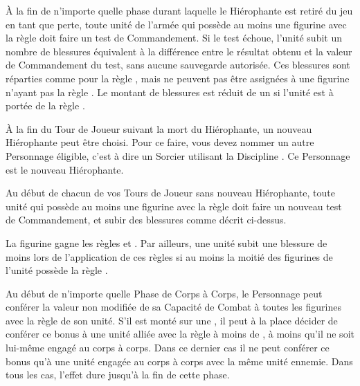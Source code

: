 \vspace*{1.5cm}
\startarmyspecialrules

\armyspecialruleentry{\dusttodust{}}

À la fin de n'importe quelle phase durant laquelle le Hiérophante est retiré du jeu en tant que perte, toute unité de l'armée qui possède au moins une figurine avec la règle \dusttodust{} doit faire un test de Commandement. Si le test échoue, l'unité subit un nombre de blessures équivalent à la différence entre le résultat obtenu et la valeur de Commandement du test, sans aucune sauvegarde autorisée. Ces blessures sont réparties comme pour la règle \unstable{}, mais ne peuvent pas être assignées à une figurine n'ayant pas la règle \dusttodust{}. Le montant de blessures est réduit de un si l'unité est à portée de la règle \holdyourground{}.

À la fin du Tour de Joueur suivant la mort du Hiérophante, un nouveau Hiérophante peut être choisi. Pour ce faire, vous devez nommer un autre Personnage éligible, c'est à dire un Sorcier utilisant la Discipline \sands{}. Ce Personnage est le nouveau Hiérophante.

Au début de chacun de vos Tours de Joueur sans nouveau Hiérophante, toute unité qui possède au moins une figurine avec la règle \dusttodust{} doit faire un nouveau test de Commandement, et subir des blessures comme décrit ci-dessus.

\armyspecialruleentry{\undeadconstruct{}}

La figurine gagne les règles \dusttodust{} et \undead{}. Par ailleurs, une unité subit une blessure de moins lors de l'application de ces règles si au moins la moitié des figurines de l'unité possède la règle \undeadconstruct{}.

\armyspecialruleentry{\undyingwill{}}

Au début de n'importe quelle Phase de Corps à Corps, le Personnage peut conférer la valeur non modifiée de sa Capacité de Combat à toutes les figurines avec la règle \undead{} de son unité. S'il est monté sur une \largetarget{}, il peut à la place décider de conférer ce bonus à une unité alliée avec la règle \undead{} à moins de , à moins qu'il ne soit lui-même engagé au corps à corps. Dans ce dernier cas il ne peut conférer ce bonus qu'à une unité \undead{} engagée au corps à corps avec la même unité ennemie. Dans tous les cas, l'effet dure jusqu'à la fin de cette phase.

\armyspecialruleentry{\necromanticaura{}}

